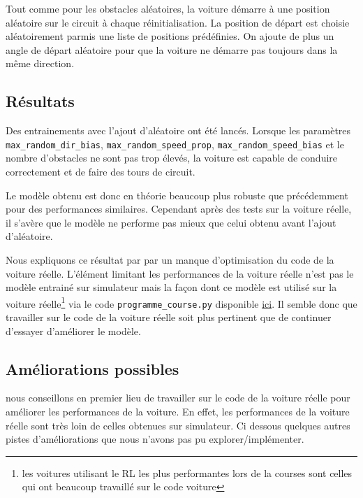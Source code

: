\documentclass[french]{article}
\begin{document}
Tout comme pour les obstacles aléatoires, la voiture démarre à une position aléatoire sur le circuit à chaque réinitialisation. La position de départ est choisie aléatoirement parmis une liste de positions prédéfinies. On ajoute de plus un angle de départ aléatoire pour que la voiture ne démarre pas toujours dans la même direction.


\subsection{Résultats}

Des entrainements avec l'ajout d'aléatoire ont été lancés. Lorsque les paramètres \verb|max_random_dir_bias|, \verb|max_random_speed_prop|, \verb|max_random_speed_bias| et le nombre d'obstacles ne sont pas trop élevés, la voiture est capable de conduire correctement et de faire des tours de circuit.

\vspace{0.5cm}

Le modèle obtenu est donc en théorie beaucoup plus robuste que précédemment pour des performances similaires. Cependant après des tests sur la voiture réelle, il s'avère que le modèle ne performe pas mieux que celui obtenu avant l'ajout d'aléatoire. 
\vspace{0.5cm}

Nous expliquons ce résultat par par un manque d'optimisation du code de la voiture réelle. L'élément limitant les performances de la voiture réelle n'est pas le modèle entrainé sur simulateur mais la façon dont ce modèle est utilisé sur la voiture réelle\footnote{les voitures utilisant le RL les plus performantes lors de la courses sont celles qui ont beaucoup travaillé sur le code voiture} via le code \verb|programme_course.py| disponible \href{https://github.com/basileplus/RCAutonomousCar.git}{ici}. Il semble donc que travailler sur le code de la voiture réelle soit plus pertinent que de continuer d'essayer d'améliorer le modèle.

\subsection{Améliorations possibles}

nous conseillons en premier lieu de travailler sur le code de la voiture réelle pour améliorer les performances de la voiture. En effet, les performances de la voiture réelle sont très loin de celles obtenues sur simulateur. Ci dessous quelques autres pistes d'améliorations que nous n'avons pas pu explorer/implémenter.
\end{document}
